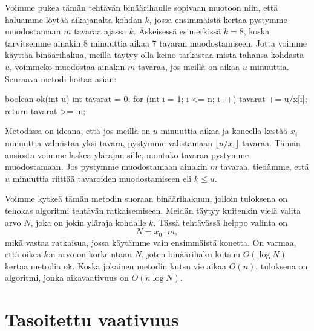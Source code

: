 Voimme pukea tämän tehtävän binäärihaulle sopivaan muotoon niin,
että haluamme löytää aikajanalta kohdan $k$, jossa ensimmäistä
kertaa pystymme muodostamaan $m$ tavaraa ajassa $k$.
Äskeisessä esimerkissä $k=8$, koska tarvitsemme ainakin 8
minuuttia aikaa 7 tavaran muodostamiseen.
Jotta voimme käyttää binäärihakua, meillä täytyy olla keino
tarkastaa mistä tahansa kohdasta $u$, voimmeko muodostaa
ainakin $m$ tavaraa, jos meillä on aikaa $u$ minuuttia.
Seuraava metodi hoitaa asian:

\begin{code}
boolean ok(int u) {
    int tavarat = 0;
    for (int i = 1; i <= n; i++) {
        tavarat += u/x[i];
    }
    return tavarat >= m;
}
\end{code}

Metodissa on ideana, että jos meillä on $u$ minuuttia aikaa
ja koneella kestää $x_i$ minuuttia valmistaa yksi tavara,
pystymme valistamaan $\lfloor u/x_i \rfloor$ tavaraa.
Tämän ansiosta voimme laskea ylärajan sille,
montako tavaraa pystymme muodostamaan.
Jos pystymme muodostamaan ainakin $m$ tavaraa,
tiedämme, että $u$ minuuttia riittää tavaroiden muodostamiseen
eli $k \le u$.

Voimme kytkeä tämän metodin suoraan binäärihakuun,
jolloin tuloksena on tehokas algoritmi tehtävän ratkaisemiseen.
Meidän täytyy kuitenkin vielä valita arvo $N$,
joka on jokin yläraja kohdalle $k$.
Tässä tehtävässä helppo valinta on
\[N = x_0 \cdot m,\]
mikä vastaa ratkaisua, jossa käytämme vain ensimmäistä konetta.
On varmaa, että oikea $k$:n arvo on korkeintaan $N$,
joten binäärihaku kutsuu $O(\log N)$ kertaa metodia $\texttt{ok}$.
Koska jokainen metodin kutsu vie aikaa $O(n)$,
tuloksena on algoritmi, jonka aikavaativuus on $O(n \log N)$.


\section{Tasoitettu vaativuus}

